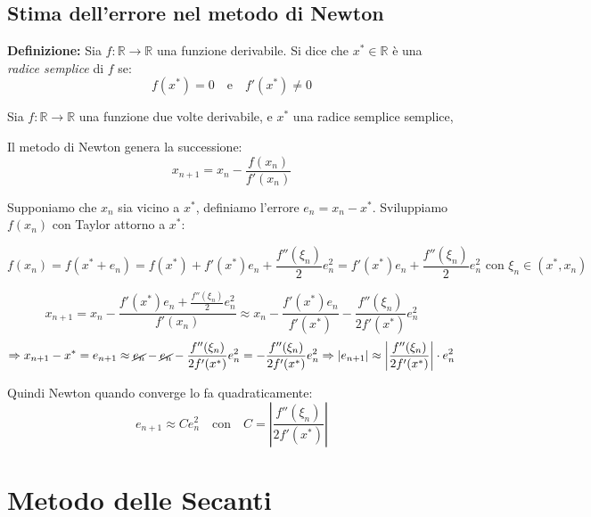 \documentclass[12pt,a4paper]{article}
\begin{document}
\newpage
\subsection*{Stima dell'errore nel metodo di Newton}
\textbf{Definizione:}
Sia \( f : \mathbb{R} \to \mathbb{R} \) una funzione derivabile. Si dice che \( x^* \in \mathbb{R} \) è una \emph{radice semplice} di \( f \) se:
\[
f(x^*) = 0 \quad \text{e} \quad f'(x^*) \ne 0
\]

Sia \( f:\mathbb{R} \to \mathbb{R} \) una funzione due volte derivabile, e \( x^* \) una radice semplice semplice,

Il metodo di Newton genera la successione:
\[
x_{n+1} = x_n - \frac{f(x_n)}{f'(x_n)}
\]

Supponiamo che \( x_n \) sia vicino a \( x^* \), definiamo l’errore \( e_n = x_n - x^* \).  
Sviluppiamo \( f(x_n) \) con Taylor attorno a \( x^* \):

\[
f(x_n) = f(x^* + e_n) = f(x^*) + f'(x^*)e_n + \frac{f''(\xi_n)}{2} e_n^2 = f'(x^*)e_n + \frac{f''(\xi_n)}{2} e_n^2\text{ con }\xi_n \in (x^*, x_n)\]

\[
x_{n+1} = x_n - \frac{f'(x^*)e_n + \frac{f''(\xi_n)}{2} e_n^2}{f'(x_n)} \approx x_n - \frac{f'(x^*)e_n}{f'(x^*)} - \frac{f''(\xi_n)}{2f'(x^*)} e_n^2
\]
\[
\Rightarrow x_{n+1} - x^* = e_{n+1} \approx \cancel{e_n} - \cancel{e_n} - \frac{f''(\xi_n)}{2f'(x^*)} e_n^2 = -\frac{f''(\xi_n)}{2f'(x^*)} e_n^2 \Rightarrow
|e_{n+1}| \approx \left|\frac{f''(\xi_n)}{2f'(x^*)}\right| \cdot e_n^2
\]

Quindi Newton quando converge lo fa quadraticamente:
\[
e_{n+1} \approx C e_n^2 \quad \text{con} \quad C = \left|\frac{f''(\xi_n)}{2f'(x^*)}\right|
\]

\newpage

\section*{Metodo delle Secanti}



\begin{flushleft}
\end{flushleft}
\end{document}
